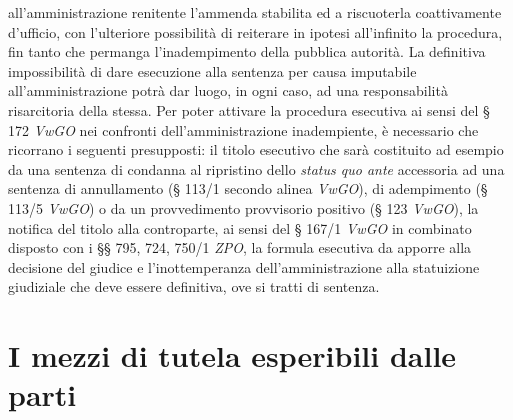 \documentclass[12pt,it,a4paper,]{report}
\begin{document}
all'amministrazione renitente l'ammenda stabilita ed a riscuoterla
coattivamente d'ufficio, con l'ulteriore possibilità di reiterare in
ipotesi all'infinito la procedura, fin tanto che permanga
l'inadempimento della pubblica autorità. La definitiva impossibilità di
dare esecuzione alla sentenza per causa imputabile all'amministrazione
potrà dar luogo, in ogni caso, ad una responsabilità risarcitoria della
stessa. Per poter attivare la procedura esecutiva ai sensi del § 172
\emph{VwGO} nei confronti dell'amministrazione inadempiente, è
necessario che ricorrano i seguenti presupposti: il titolo esecutivo che
sarà costituito ad esempio da una sentenza di condanna al ripristino
dello \emph{status quo ante} accessoria ad una sentenza di annullamento
(§ 113/1 secondo alinea \emph{VwGO}), di adempimento (§ 113/5
\emph{VwGO}) o da un provvedimento provvisorio positivo (§ 123
\emph{VwGO}), la notifica del titolo alla controparte, ai sensi del §
167/1 \emph{VwGO} in combinato disposto con i §§ 795, 724, 750/1
\emph{ZPO}, la formula esecutiva da apporre alla decisione del giudice e
l'inottemperanza dell'amministrazione alla statuizione giudiziale che
deve essere definitiva, ove si tratti di sentenza.

\hypertarget{i-mezzi-di-tutela-esperibili-dalle-parti}{%
\section{I mezzi di tutela esperibili dalle
parti}\label{i-mezzi-di-tutela-esperibili-dalle-parti}}
\end{document}
